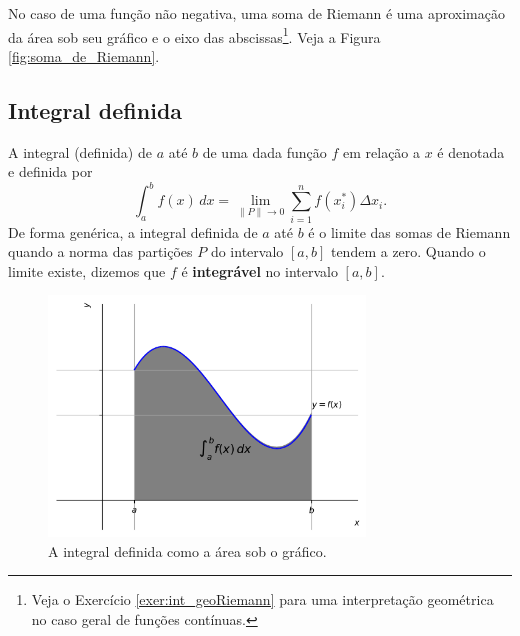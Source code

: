 \cleardoublepage\documentclass[../main.tex]{subfiles}
\begin{document}
\begin{obs}
No caso de uma função não negativa, uma soma de Riemann é uma aproximação da área sob seu gráfico e o eixo das abscissas\footnote{Veja o Exercício \ref{exer:int_geoRiemann} para uma interpretação geométrica no caso geral de funções contínuas.}. Veja a Figura \ref{fig:soma_de_Riemann}.
\end{obs}

\subsection{Integral definida}
A integral (definida) de $a$ até $b$ de uma dada função $f$ em relação a $x$ é denotada e definida por
\begin{equation}
  \int_a^b f(x)\,dx = \lim_{\|P\|\to 0} \sum_{i=1}^n f(x_i^*)\Delta x_i.
\end{equation}
De forma genérica, a integral definida de $a$ até $b$ é o limite das somas de Riemann quando a norma das partições $P$ do intervalo $[a, b]$ tendem a zero. Quando o limite existe, dizemos que $f$ é \textbf{integrável} no intervalo $[a, b]$.
\begin{figure}[H]
  \centering
  \includegraphics[width=0.75\textwidth]{figs/fig_geointdef}
  \caption{A integral definida como a área sob o gráfico.}
  \label{fig:geointdef}
\end{figure}
\vspace{-0.5cm}
\end{document}

